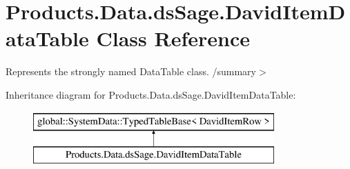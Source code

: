 \hypertarget{class_products_1_1_data_1_1ds_sage_1_1_david_item_data_table}{}\section{Products.\+Data.\+ds\+Sage.\+David\+Item\+Data\+Table Class Reference}
\label{class_products_1_1_data_1_1ds_sage_1_1_david_item_data_table}


Represents the strongly named Data\+Table class. /summary$>$  


Inheritance diagram for Products.\+Data.\+ds\+Sage.\+David\+Item\+Data\+Table\+:\begin{figure}[H]
\begin{center}
\leavevmode
\includegraphics[height=2.000000cm]{class_products_1_1_data_1_1ds_sage_1_1_david_item_data_table}
\end{center}
\end{figure}
